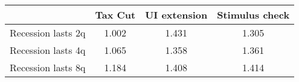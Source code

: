 \begin{tabular}{@{}lccc@{}}
\toprule
& Tax Cut    & UI extension    & Stimulus check    \\  \midrule
Recession lasts 2q &1.002  & 1.431  & 1.305     \\
Recession lasts 4q &1.065  & 1.358  & 1.361     \\
Recession lasts 8q &1.184  & 1.408  & 1.414     \\
\end{tabular}
